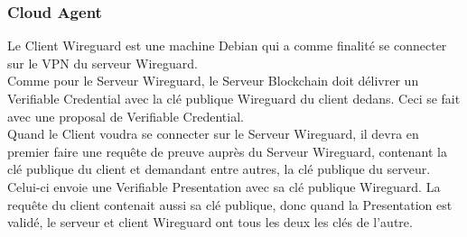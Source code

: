 \documentclass[12pt, openany]{report}
\begin{document}
\subsubsection{Cloud Agent}
\noindent 
\begin{flushleft}
Le Client Wireguard est une machine Debian qui a comme finalité se connecter sur le VPN du serveur Wireguard. \\
Comme pour le Serveur Wireguard, le Serveur Blockchain doit délivrer un Verifiable Credential avec la clé publique Wireguard du client dedans. Ceci se fait avec une proposal de Verifiable Credential. \\
Quand le Client voudra se connecter sur le Serveur Wireguard, il devra en premier faire une requête de preuve auprès du Serveur Wireguard, contenant la clé publique du client et demandant entre autres, la clé publique du serveur. Celui-ci envoie une Verifiable Presentation avec sa clé publique Wireguard. La requête du client contenait aussi sa clé publique, donc quand la Presentation est validé, le serveur et client Wireguard ont tous les deux les clés de l'autre.

\end{flushleft}
\end{document}
